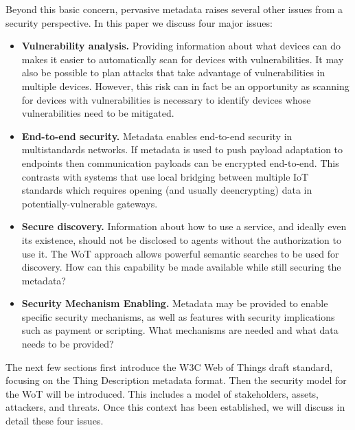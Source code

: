 Beyond this basic concern, pervasive metadata raises several other issues
from a security perspective.
In this paper we discuss four major issues:
\begin{itemize}
\item \textbf{Vulnerability analysis.}
Providing information about what devices can do makes it easier to 
automatically scan for devices with vulnerabilities.
It may also be possible to plan attacks that take advantage of vulnerabilities
in multiple devices. 
However, this risk can in fact be an opportunity as scanning for devices with
vulnerabilities is necessary to identify devices whose vulnerabilities need to be mitigated.
\item \textbf{End-to-end security.}
Metadata enables end-to-end security in multistandards networks.
If metadata is used to push payload adaptation to endpoints then 
communication payloads can be encrypted end-to-end.  This contrasts
with systems that use local bridging between multiple IoT standards
which requires opening (and usually deencrypting) data in potentially-vulnerable gateways.
\item \textbf{Secure discovery.}
Information about how to use a service, and ideally even its existence, should not
be disclosed to agents without the authorization to use it.
The WoT approach allows powerful semantic searches to be used for discovery.
How can this capability be made available while still securing the metadata?
\item \textbf{Security Mechanism Enabling.}
Metadata may be provided to enable specific security mechanisms,
as well as features with security implications such as payment or scripting.
What mechanisms are needed and what data needs to be provided?
\end{itemize}

The next few sections first introduce the W3C Web of Things draft standard,
focusing on the Thing Description metadata format.  
Then the security model for the WoT will be introduced.
This includes a model of stakeholders, assets, attackers, and threats.
Once this context has been established, we will discuss in detail these
four issues.

